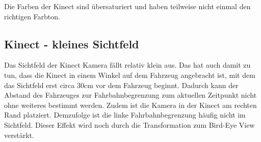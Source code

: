 Die Farben der Kinect sind übersaturiert und haben teilweise nicht einmal den richtigen Farbton.

\subsection{Kinect - kleines Sichtfeld}
\label{sec:sichtfeld}
Das Sichtfeld der Kinect Kamera fällt relativ klein aus.
Das hat auch damit zu tun, dass die Kinect in einem Winkel auf dem Fahrzeug angebracht ist, mit dem das Sichtfeld erst circa 30cm vor dem Fahrzeug beginnt.
Dadurch kann der Abstand des Fahrzeuges zur Fahrbahnbegrenzung zum aktuellen Zeitpunkt nicht ohne weiteres bestimmt werden. 
Zudem ist die Kamera in der Kinect am rechten Rand platziert.
Demzufolge ist die linke Fahrbahnbegrenzung häufig nicht im Sichtfeld.
Dieser Effekt wird noch durch die Transformation zum Bird-Eye View verstärkt.

